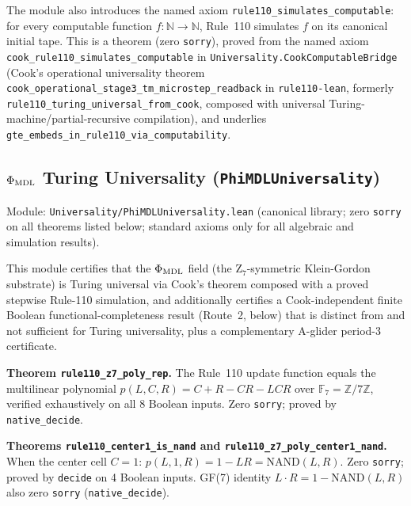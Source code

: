 \documentclass[11pt,a4paper]{article}
\newenvironment{keybox}[1]{%
  \Needspace*{8\baselineskip}%
  \begin{tcolorbox}[
    enhanced,
    breakable=false,
    colback=blue!5,
    colframe=blue!45!black,
    coltitle=black,
    colbacktitle=blue!14,
    boxrule=0.85pt,
    arc=2.5pt,
    left=9pt, right=9pt, top=6pt, bottom=6pt,
    titlerule=0.55pt,
    fonttitle=\bfseries,
    title={#1},
    before upper=\raggedright,
    before skip=0.9\baselineskip,
    after skip=0.9\baselineskip
  ]%
}{%
  \end{tcolorbox}%
}
\theoremstyle{definition}
\begin{document}
The module also introduces the named axiom
\texttt{rule110\_simulates\_computable}: for every computable function
$f : \mathbb{N} \to \mathbb{N}$, Rule~110 simulates $f$ on its canonical
initial tape.  This is a theorem (zero \texttt{sorry}), proved from the named axiom
\lstinline|cook_rule110_simulates_computable| in \texttt{Universality.CookComputableBridge}
(Cook's operational universality theorem
\lstinline|cook_operational_stage3_tm_microstep_readback| in \texttt{rule110-lean},
formerly \lstinline|rule110_turing_universal_from_cook|,
composed with universal Turing-machine/partial-recursive compilation), and underlies
\lstinline|gte_embeds_in_rule110_via_computability|.

\subsection{\texorpdfstring{$\Phi_{\rm MDL}$ Turing Universality}{PhiMDL Turing Universality}
  (\texttt{PhiMDLUniversality})}\label{subsec:phimdl-universality}

Module: \texttt{Universality/PhiMDLUniversality.lean}
(canonical library; zero \texttt{sorry} on all theorems listed below;
standard axioms only for all algebraic and simulation results).

This module certifies that the $\Phi_{\rm MDL}$ field (the Z$_7$-symmetric
Klein-Gordon substrate) is Turing universal via Cook's theorem composed with a
proved stepwise Rule-110 simulation, and additionally certifies a Cook-independent
finite Boolean functional-completeness result (Route~2, below) that is distinct
from and not sufficient for Turing universality, plus a complementary A-glider
period-3 certificate.

\begin{keybox}{GF(7) polynomial representation of Rule~110 (Route~A foundation)}
\textbf{Theorem \lstinline|rule110_z7_poly_rep|.}
The Rule~110 update function equals the multilinear polynomial
$p(L,C,R) = C + R - CR - LCR$ over $\mathbb{F}_7 = \mathbb{Z}/7\mathbb{Z}$,
verified exhaustively on all 8 Boolean inputs.
Zero \texttt{sorry}; proved by \lstinline|native_decide|.
\end{keybox}

\begin{keybox}{Center-1 NAND gate (Cook-independent Step~3)}
\textbf{Theorems \lstinline|rule110_center1_is_nand| and \lstinline|rule110_z7_poly_center1_nand|.}
When the center cell $C = 1$: $p(L,1,R) = 1 - LR = \mathrm{NAND}(L,R)$.
Zero \texttt{sorry}; proved by \lstinline|decide| on 4 Boolean inputs.
GF(7) identity $L \cdot R = 1 - \mathrm{NAND}(L,R)$ also zero \texttt{sorry}
(\lstinline|native_decide|).
\end{keybox}
\end{document}
